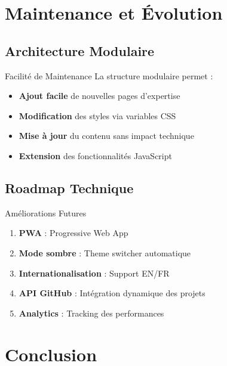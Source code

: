 \documentclass[12pt,a4paper]{article}
\begin{document}
\section{Maintenance et Évolution}

\subsection{Architecture Modulaire}

\begin{yellowbox}{Facilité de Maintenance}
La structure modulaire permet :
\begin{itemize}[label=\textcolor{yellowcolor}{$\diamond$}]
    \item \textbf{Ajout facile} de nouvelles pages d'expertise
    \item \textbf{Modification} des styles via variables CSS
    \item \textbf{Mise à jour} du contenu sans impact technique
    \item \textbf{Extension} des fonctionnalités JavaScript
\end{itemize}
\end{yellowbox}

\subsection{Roadmap Technique}

\begin{greenbox}{Améliorations Futures}
\begin{enumerate}[label=\textcolor{greencolor}{\Roman*.}]
    \item \textbf{PWA} : Progressive Web App
    \item \textbf{Mode sombre} : Theme switcher automatique
    \item \textbf{Internationalisation} : Support EN/FR
    \item \textbf{API GitHub} : Intégration dynamique des projets
    \item \textbf{Analytics} : Tracking des performances
\end{enumerate}
\end{greenbox}

\section{Conclusion}
\end{document}
